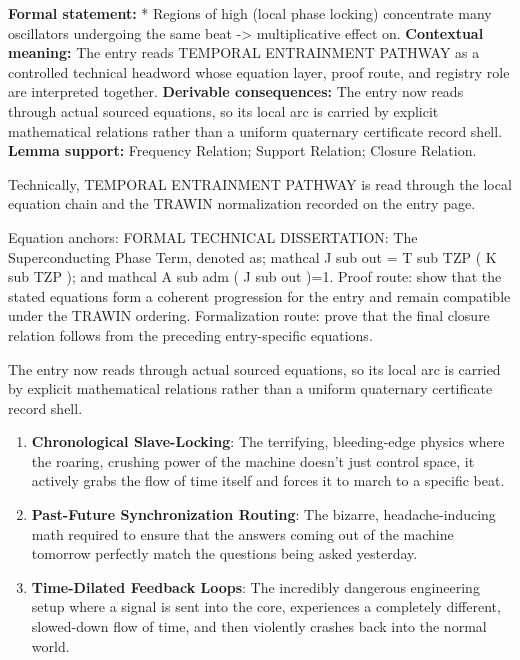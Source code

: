 \begingroup\footnotesize\setlength{\emergencystretch}{3em}\sloppy
\textbf{Formal statement:} * Regions of high (local phase locking) concentrate many oscillators undergoing the same beat -> multiplicative effect on. \textbf{Contextual meaning:} The entry reads TEMPORAL ENTRAINMENT PATHWAY as a controlled technical headword whose equation layer, proof route, and registry role are interpreted together. \textbf{Derivable consequences:} The entry now reads through actual sourced equations, so its local arc is carried by explicit mathematical relations rather than a uniform quaternary certificate record shell. \textbf{Lemma support:} Frequency Relation; Support Relation; Closure Relation.\par
\endgroup

Technically, TEMPORAL ENTRAINMENT PATHWAY is read through the local equation chain and the TRAWIN normalization recorded on the entry page.

Equation anchors: FORMAL TECHNICAL DISSERTATION: The Superconducting Phase Term, denoted as; mathcal J sub out = T sub TZP ( K sub TZP ); and mathcal A sub adm ( J sub out )=1. Proof route: show that the stated equations form a coherent progression for the entry and remain compatible under the TRAWIN ordering. Formalization route: prove that the final closure relation follows from the preceding entry-specific equations.

The entry now reads through actual sourced equations, so its local arc is carried by explicit mathematical relations rather than a uniform quaternary certificate record shell.
\endgroup

\begin{enumerate}[leftmargin=1.6em,itemsep=6pt,topsep=4pt]
\item \textbf{Chronological Slave-Locking}: The terrifying, bleeding-edge physics where the roaring, crushing power of the machine doesn't just control space, it actively grabs the flow of time itself and forces it to march to a specific beat.
\item \textbf{Past-Future Synchronization Routing}: The bizarre, headache-inducing math required to ensure that the answers coming out of the machine tomorrow perfectly match the questions being asked yesterday.
\item \textbf{Time-Dilated Feedback Loops}: The incredibly dangerous engineering setup where a signal is sent into the core, experiences a completely different, slowed-down flow of time, and then violently crashes back into the normal world.
\end{enumerate}

